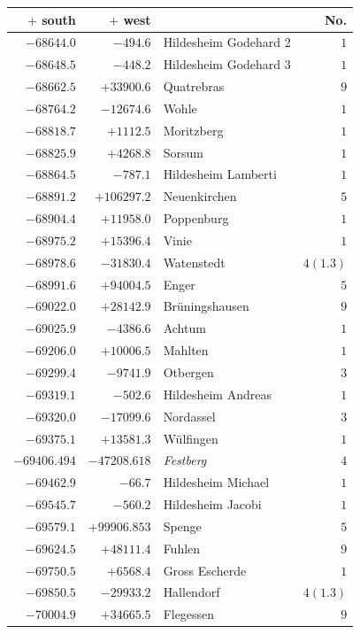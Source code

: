 \clearpage{}%
\begin{center}\begingroup\fontsize{8}{9}\selectfont
\setlength{\tabcolsep}{4pt}
\begin{tabular}{r|r|p{170pt}|r}\hline
\(+\) south&\(+\) west&&No.\\\hline
\(-68644.0\)&\(-494.6\)&Hildesheim Godehard 2&\(1\)\\
\(-68648.5\)&\(-448.2\)&Hildesheim Godehard 3&\(1\)\\
\(-68662.5\)&\(+33900.6\)&Quatrebras&\(9\)\\
\(-68764.2\)&\(-12674.6\)&Wohle&\(1\)\\
\(-68818.7\)&\(+1112.5\)&Moritzberg&\(1\)\\
\(-68825.9\)&\(+4268.8\)&Sorsum&\(1\)\\
\(-68864.5\)&\(-787.1\)&Hildesheim Lamberti&\(1\)\\
\(-68891.2\)&\(+106297.2\)&Neuenkirchen&\(5\)\\
\(-68904.4\)&\(+11958.0\)&Poppenburg&\(1\)\\
\(-68975.2\)&\(+15396.4\)&Vinie&\(1\)\\
\(-68978.6\)&\(-31830.4\)&Watenstedt&\(4(1.3)\)\\
\(-68991.6\)&\(+94004.5\)&Enger&\(5\)\\
\(-69022.0\)&\(+28142.9\)&Brüningshausen&\(9\)\\
\(-69025.9\)&\(-4386.6\)&Achtum&\(1\)\\
\(-69206.0\)&\(+10006.5\)&Mahlten&\(1\)\\
\(-69299.4\)&\(-9741.9\)&Otbergen&\(3\)\\
\(-69319.1\)&\(-502.6\)&Hildesheim Andreas&\(1\)\\
\(-69320.0\)&\(-17099.6\)&Nordassel&\(3\)\\
\(-69375.1\)&\(+13581.3\)&Wülfingen&\(1\)\\
\(-69406.494\)&\(-47208.618\)&\textit{Festberg}&\(4\)\\
\(-69462.9\)&\(-66.7\)&Hildesheim Michael&\(1\)\\
\(-69545.7\)&\(-560.2\)&Hildesheim Jacobi&\(1\)\\
\(-69579.1\)&\(+99906.853\)&Spenge&\(5\)\\
\(-69624.5\)&\(+48111.4\)&Fuhlen&\(9\)\\
\(-69750.5\)&\(+6568.4\)&Gross Escherde&\(1\)\\
\(-69850.5\)&\(-29933.2\)&Hallendorf&\(4(1.3)\)\\
\(-70004.9\)&\(+34665.5\)&Flegessen&\(9\)\\

\end{tabular}
\end{center}
